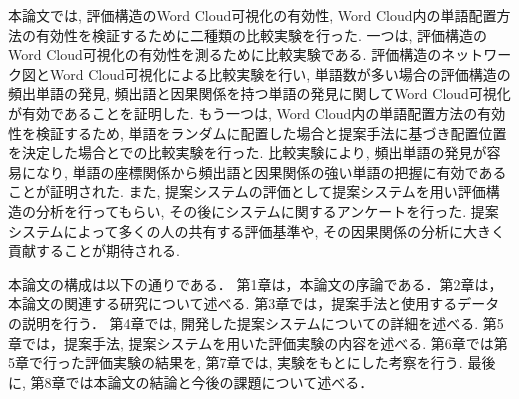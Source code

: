 \documentclass[syuuron]{kuee}
\begin{document}
	本論文では, 評価構造のWord Cloud可視化の有効性, Word Cloud内の単語配置方法の有効性を検証するために二種類の比較実験を行った. 
	一つは, 評価構造のWord Cloud可視化の有効性を測るために比較実験である.  
	評価構造のネットワーク図とWord Cloud可視化による比較実験を行い, 
	単語数が多い場合の評価構造の頻出単語の発見, 頻出語と因果関係を持つ単語の発見に関してWord Cloud可視化が有効であることを証明した. 
	もう一つは, Word Cloud内の単語配置方法の有効性を検証するため, 
	単語をランダムに配置した場合と提案手法に基づき配置位置を決定した場合とでの比較実験を行った. 
	比較実験により, 頻出単語の発見が容易になり, 単語の座標関係から頻出語と因果関係の強い単語の把握に有効であることが証明された. 
	また, 提案システムの評価として提案システムを用い評価構造の分析を行ってもらい, その後にシステムに関するアンケートを行った. 
	提案システムによって多くの人の共有する評価基準や, その因果関係の分析に大きく貢献することが期待される. 

	本論文の構成は以下の通りである．
	第1章は，本論文の序論である．第2章は，本論文の関連する研究について述べる. 第3章では，提案手法と使用するデータの説明を行う．
	第4章では, 開発した提案システムについての詳細を述べる. 
	第5章では，提案手法, 提案システムを用いた評価実験の内容を述べる. 
	第6章では第5章で行った評価実験の結果を, 第7章では, 実験をもとにした考察を行う. 
	最後に, 第8章では本論文の結論と今後の課題について述べる．
\end{document}
